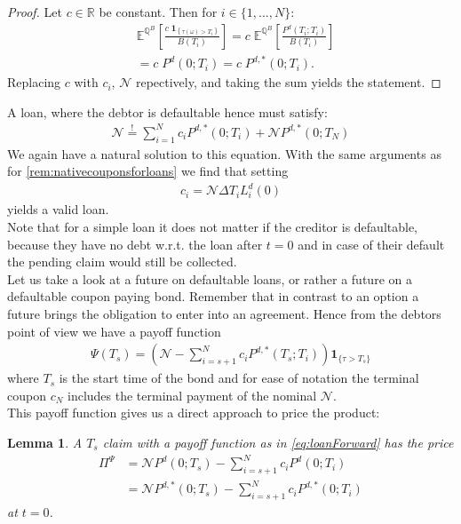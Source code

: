 \documentclass[12pt]{article}
\newcommand{\mbeq}{\overset{!}{=}}
\newtheorem{lemma}[theorem]{Lemma}
\begin{document}
	\begin{proof}
		Let $c\in \mathbb{R}$ be constant. Then for $i \in \{1, ..., N\}$:
		\begin{align*}
			&\mathbb{E}^{\mathbb{Q}^B}\left[\frac{c\;\mathbf{1}_{\left\{\tau(\omega) > T_{i} \right\}}}{B(T_i)}\right] = c \; \mathbb{E}^{\mathbb{Q}^B}\left[ 
			\frac{P^d(T_i;T_i)}{B(T_i)} \right]\\
			&= c \; P^d(0;T_i) = c \; P^{d,*}(0;T_i).
		\end{align*}
		Replacing $c$ with $c_i$, $\mathcal{N}$ repectively, and taking the sum yields the statement.
	\end{proof}
	A loan, where the debtor is defaultable hence must satisfy:
	\begin{align*}
		\mathcal{N} \mbeq \sum_{i=1}^{N}c_i P^{d,*}(0;T_i) + \mathcal{N}P^{d,*}(0;T_N)
	\end{align*}
	We again have a natural solution to this equation. With the same arguments as for \cref{rem:nativecouponsforloans} we find that setting
	\begin{align*}
		c_i = \mathcal{N}\Delta T_iL^d_i(0)
	\end{align*}
	yields a valid loan.\\
	Note that for a simple loan it does not matter if the creditor is defaultable, because they have no debt w.r.t. the loan after $t=0$ and in case of their default the pending claim would still be collected.\\
	Let us take a look at a future on defaultable loans, or rather a future on a defaultable coupon paying bond. 
	Remember that in contrast to an option a future brings the obligation to enter into an agreement.
	Hence from the debtors point of view we have a payoff function
	\begin{align}\label{eq:loanForward}
		\Psi(T_s) = \left(\mathcal{N} - \sum_{i=s+1}^{N}c_iP^{d,*}(T_s; T_i)\right)\mathbf{1}_{\{\tau > T_s\}}
	\end{align}
	where $T_s$ is the start time of the bond and for ease of notation the terminal coupon $c_N$ includes the terminal payment of the nominal $\mathcal{N}$.\\
	This payoff function gives us a direct approach to price the product:
	\begin{lemma}\label{lm:simpledefcouponbondforward}
		A $T_s$ claim with a payoff function as in \cref{eq:loanForward} has the price
		\begin{align*}
			\Pi^\Psi &= \mathcal{N}P^d(0;T_s) - \sum_{i=s+1}^{N}c_iP^{d}(0; T_i)\\
			&= \mathcal{N}P^{d,*}(0;T_s) - \sum_{i=s+1}^{N}c_iP^{d,*}(0; T_i)
		\end{align*}
		at $t=0$.
	\end{lemma}
\end{document}
